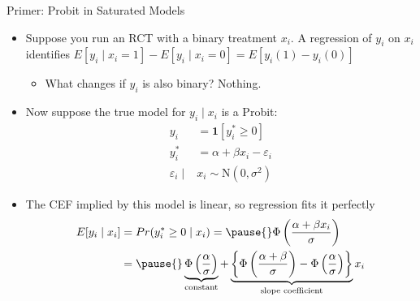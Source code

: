 \documentclass[11pt,english]{beamer}
\begin{document}
\begin{frame}{Primer: Probit in Saturated Models}

\vspace{0.2cm}
\begin{itemize}
\item Suppose you run an RCT with a binary treatment $x_i$. A regression of $y_i$ on $x_i$ identifies $E[y_i\mid x_i=1]-E[y_i\mid x_i=0]=E[y_i(1)-y_i(0)]$\smallskip
\begin{itemize}
\item What changes if $y_i$ is also binary?\pause{} Nothing.
\end{itemize}\bigskip\pause{}

\item Now suppose the true model for $y_i\mid x_i$ is a Probit:
\begin{align*}
y_i&=\mathbf{1}[y_i^*\ge 0]\\
y_i^*&=\alpha+\beta x_i - \varepsilon_i\\
\varepsilon_i\mid & x_i \sim \mathrm{N}(0,\sigma^2)
\end{align*}\pause{}\vspace{-0.3cm}

\item The CEF implied by this model is linear, so regression fits it perfectly
\begin{align*}
E[y_i\mid x_i]&=Pr(y_i^*\ge 0\mid x_i) =\pause{} \Phi\left(\frac{\alpha + \beta x_i}{\sigma}\right) \\
&=\pause{} \underbrace{\Phi\left(\frac{\alpha}{\sigma}\right)}_{\text{constant}} + \underbrace{\left\{\Phi\left(\frac{\alpha+\beta}{\sigma}\right)-\Phi\left(\frac{\alpha}{\sigma}\right)\right\}}_{\text{slope coefficient}}x_i 
\end{align*}
\end{itemize}
\end{frame}
\end{document}
